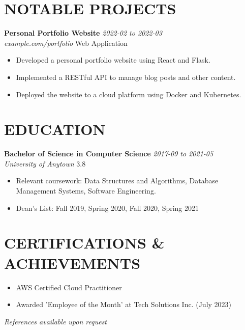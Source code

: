 \documentclass[11pt,letterpaper]{article}
\newcommand{\jobTitle}[2]{
  \textbf{\textcolor{primary}{#1}} \hfill \textit{#2}\\
}
\newcommand{\companyInfo}[2]{
  \textit{#1} \hfill #2\\
}
\newcommand{\bulletItem}[1]{
  \item #1
}
\newcommand{\customBullets}[1]{
  \begin{itemize}[leftmargin=*,label=\textcolor{secondary}{\scriptsize\textbullet},itemsep=2pt,parsep=0pt]
    #1
  \end{itemize}
}
\begin{document}
\vspace{8pt}
\section{NOTABLE PROJECTS}

\jobTitle{Personal Portfolio Website}{2022-02 to 2022-03}
\companyInfo{example.com/portfolio}{Web Application}
\customBullets{
  \bulletItem{Developed a personal portfolio website using React and Flask.}
  \bulletItem{Implemented a RESTful API to manage blog posts and other content.}
  \bulletItem{Deployed the website to a cloud platform using Docker and Kubernetes.}
}
\vspace{8pt}
\section{EDUCATION}

\jobTitle{Bachelor of Science in Computer Science}{2017-09 to 2021-05}
\companyInfo{University of Anytown}{3.8}
\customBullets{
  \bulletItem{Relevant coursework: Data Structures and Algorithms, Database Management Systems, Software Engineering.}
  \bulletItem{Dean's List: Fall 2019, Spring 2020, Fall 2020, Spring 2021}
}
\vspace{4pt}
\section{CERTIFICATIONS \& ACHIEVEMENTS}
\begin{multicols}{2}
\customBullets{
  \bulletItem{AWS Certified Cloud Practitioner}
}

\columnbreak

\customBullets{
  \bulletItem{Awarded 'Employee of the Month' at Tech Solutions Inc. (July 2023)}
}
\end{multicols}


\vspace{-0.3cm}
\begin{center}
\textit{\textcolor{secondary}{References available upon request}}
\end{center}
\end{document}
